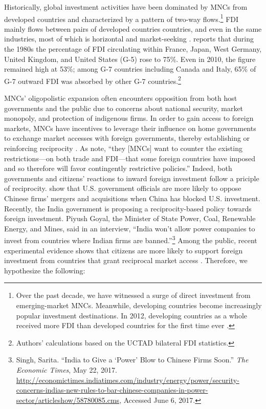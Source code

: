 \documentclass[reqno,onecolumn,letterpaper,12pt]{article}
\begin{document}
Historically, global investment activities have been dominated by MNCs from developed countries and characterized by a pattern of two-way flows.\footnote{Over the past decade, we have witnessed a surge of direct investment from emerging-market MNCs. Meanwhile, developing countries become increasingly popular investment destinations. In 2012, developing countries as a whole received more FDI than developed countries for the first time ever \citep{UNCTAD:2013}.} FDI mainly flows between pairs of developed countries countries, and even in the same industries, most of which is horizontal and market-seeking \citep[171]{Markusen:1995}. \citet[~22]{Julius:1990} reports that during the 1980s the percentage of FDI circulating within France, Japan, West Germany, United Kingdom, and United States (G-5) rose to 75\%. Even in 2010, the figure remained high at 53\%; among G-7 countries including Canada and Italy, 65\% of G-7 outward FDI was absorbed by other G-7 countries.\footnote{Authors' calculations based on the UCTAD bilateral FDI statistics.}

MNCs' oligopolistic expansion often encounters opposition from both host governments and the public due to concerns about national security, market monopoly, and protection of indigenous firms. In order to gain access to foreign markets, MNCs have incentives to leverage their influence on home governments to exchange market accesses with foreign governments, thereby establishing or reinforcing reciprocity \citep{Milner:1988,Crystal:2003}. As \citet[6]{Crystal:2003} note, ``they [MNCs] want to counter the existing restrictions---on both trade and FDI---that some foreign countries have imposed and so therefore will favor contingently restrictive policies.'' Indeed, both governments and citizens' reactions to inward foreign investment follow a priciple of reciprocity. \citet{Tingley:2015} show that U.S. government officials are more likely to oppose Chinese firms' mergers and acquisitions when China has blocked U.S. investment. Recently, the India government is proposing a reciprocity-based policy towards foreign investment. Piyush Goyal, the Minister of State Power, Coal, Renewable Energy, and Mines, said in an interview, ``India won't allow power companies to invest from countries where Indian firms are banned.''\footnote{Singh, Sarita. ``India to Give a `Power' Blow to Chinese Firms Soon.'' \textit{The Economic Times}, May 22, 2017. \url{http://economictimes.indiatimes.com/industry/energy/power/security-concerns-indias-new-rules-to-bar-chinese-companies-in-power-sector/articleshow/58780085.cms}, Accessed June 6, 2017.} Among the public, recent experimental evidence shows that citizens are more likely to support foreign investment from countries that grant reciprocal market access \citep{Chilton_et_al:forthcoming}. Therefore, we hypothesize the following:
\end{document}
